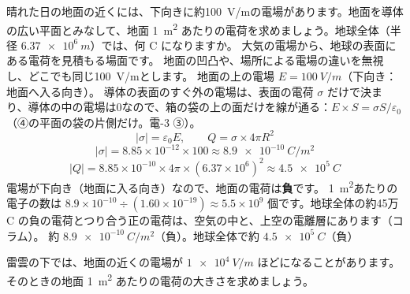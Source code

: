 \label{ph:電-2:ex6}
\begin{phreidai}[地球の表面の電荷]
晴れた日の地面の近くには、下向きに約\qty{100}{V/m}の電場があります。地面を導体の広い平面とみなして、地面 \qty{1}{m^2} あたりの電荷を求めましょう。地球全体（半径 $\qty{6.37e6}{m}$）では、何 C になりますか。
\phbamen
大気の電場から、地球の表面にある電荷を見積もる場面です。
\phmushi
地面の凹凸や、場所による電場の違いを無視し、どこでも同じ\qty{100}{V/m}とします。
\phzu
地面の上の電場 $E=\qty{100}{V/m}$（下向き：地面へ入る向き）。
\phriyu
導体の表面のすぐ外の電場は、表面の電荷 $\sigma$ だけで決まり、導体の中の電場は0なので、箱の袋の上の面だけを線が通る：$E\times S=\sigma S/\varepsilon_0$（④の平面の袋の片側だけ。電-3 ③）。
\phtateru
\[|\sigma|=\varepsilon_0E,\qquad Q=\sigma\times4\pi R^2\]
\phtoku
\[|\sigma|=8.85\times10^{-12}\times100\approx\qty{8.9e-10}{C/m^2}\]
\[|Q|=8.85\times10^{-10}\times4\pi\times(6.37\times10^6)^2\approx\qty{4.5e5}{C}\]
電場が下向き（地面に入る向き）なので、地面の電荷は\textbf{負}です。
\phtashikame
\qty{1}{m^2}あたりの電子の数は $8.9\times10^{-10}\div(1.60\times10^{-19})\approx5.5\times10^9$ 個です。地球全体の約45万 C の負の電荷とつり合う正の電荷は、空気の中と、上空の電離層にあります（コラム）。
\kotae 約 $\qty{8.9e-10}{C/m^2}$（負）。地球全体で約 $\qty{4.5e5}{C}$（負）
\end{phreidai}
\begin{jibun}
雷雲の下では、地面の近くの電場が $\qty{1e4}{V/m}$ ほどになることがあります。そのときの地面 \qty{1}{m^2} あたりの電荷の大きさを求めましょう。
\end{jibun}

